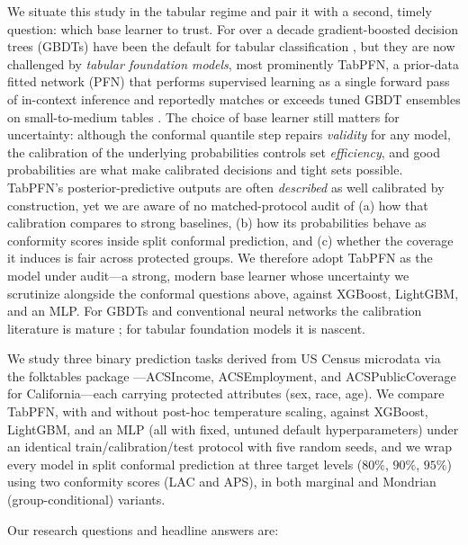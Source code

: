 \documentclass[review,12pt]{elsarticle}
\begin{document}
We situate this study in the tabular regime and pair it with a second, timely question: which base learner to trust. For over a decade gradient-boosted decision trees (GBDTs) have been the default for tabular classification \cite{grinsztajn2022}, but they are now challenged by \emph{tabular foundation models}, most prominently TabPFN, a prior-data fitted network (PFN) that performs supervised learning as a single forward pass of in-context inference and reportedly matches or exceeds tuned GBDT ensembles on small-to-medium tables \cite{tabpfn2023,tabpfn2025}. The choice of base learner still matters for uncertainty: although the conformal quantile step repairs \emph{validity} for any model, the calibration of the underlying probabilities controls set \emph{efficiency}, and good probabilities are what make calibrated decisions and tight sets possible. TabPFN's posterior-predictive outputs are often \emph{described} as well calibrated by construction, yet we are aware of no matched-protocol audit of (a) how that calibration compares to strong baselines, (b) how its probabilities behave as conformity scores inside split conformal prediction, and (c) whether the coverage it induces is fair across protected groups. We therefore adopt TabPFN as the model under audit---a strong, modern base learner whose uncertainty we scrutinize alongside the conformal questions above, against XGBoost, LightGBM, and an MLP. For GBDTs and conventional neural networks the calibration literature is mature \cite{guo2017,niculescu2005}; for tabular foundation models it is nascent.

We study three binary prediction tasks derived from US Census microdata via the folktables package \cite{ding2021}---ACSIncome, ACSEmployment, and ACSPublicCoverage for California---each carrying protected attributes (sex, race, age). We compare TabPFN, with and without post-hoc temperature scaling, against XGBoost, LightGBM, and an MLP (all with fixed, untuned default hyperparameters) under an identical train/calibration/test protocol with five random seeds, and we wrap every model in split conformal prediction at three target levels ($80\%$, $90\%$, $95\%$) using two conformity scores (LAC and APS), in both marginal and Mondrian (group-conditional) variants.

Our research questions and headline answers are:
\end{document}
